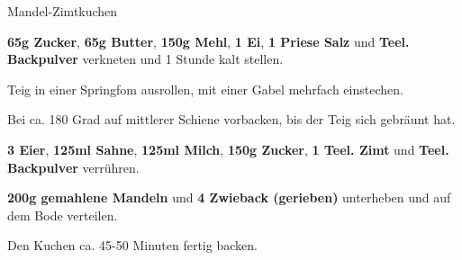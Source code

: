 \begin{recipe}[]{Mandel-Zimtkuchen} %
	\personcount{} %

\step
\textbf{65g Zucker}, \textbf{65g Butter}, \textbf{150g Mehl}, \textbf{1 Ei}, \textbf{1 Priese Salz} und \textbf{ Teel. Backpulver} verkneten und 1 Stunde kalt stellen.

\step
Teig in einer Springfom ausrollen, mit einer Gabel mehrfach einstechen.

\step
Bei ca. 180 Grad auf mittlerer Schiene vorbacken, bis der Teig sich gebräunt hat.

\step
\textbf{3 Eier}, \textbf{125ml Sahne}, \textbf{125ml Milch}, \textbf{150g Zucker}, \textbf{1 Teel. Zimt} und \textbf{ Teel. Backpulver} verrühren.

\step
\textbf{200g gemahlene Mandeln} und \textbf{4 Zwieback (gerieben)} unterheben und auf dem Bode verteilen.

\step
Den Kuchen ca. 45-50 Minuten fertig backen.

\end{recipe}